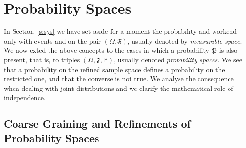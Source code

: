 
		\section{Probability Spaces}

		In Section~\ref{s:sys} we have set aside for a moment the probability and workend only with events and on the pair $(\Omega, \mathfrak F)$, usually denoted by \emph{measurable space}. We now exted the above concepts to the cases in which a probability $\mathfrak P$ is also present, that is, to triples $(\Omega, \mathfrak F, \mathbb P)$, usually denoted \emph{probability spaces}. We see that a probability on the refined sample space defines a probability on the restricted one, and that the converse is not true. We analyse the consequence when dealing with joint distributions and we clarify the mathematical role of independence.
		
		\subsection{Coarse Graining and Refinements of Probability Spaces}
		
